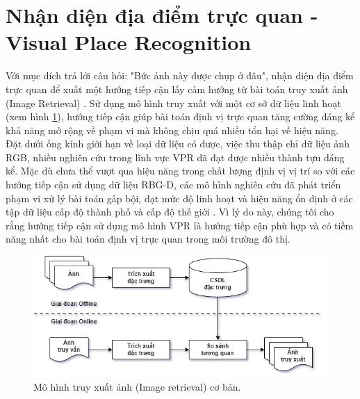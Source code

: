 \section{Nhận diện địa điểm trực quan - Visual Place Recognition}

Với mục đích trả lới câu hỏi: "Bức ảnh này được chụp ở đâu", nhận diện địa điểm trực quan để xuất một hướng tiếp cận lấy cảm hướng từ bài toán truy xuất ảnh (Image Retrieval) \cite{2022arXiv220105816X}. Sử dụng mô hình truy xuất với một cơ sở dữ liệu linh hoạt (xem hình \ref{fig:ir}), hướng tiếp cận giúp bài toán định vị trực quan tăng cường đáng kể khả năng mở rộng về phạm vi mà không chịu quá nhiều tổn hại về hiệu năng. Đặt dưới ống kính giới hạn về loại dữ liệu có được, việc thu thập chỉ dữ liệu ảnh RGB, nhiều nghiên cứu trong lĩnh vực VPR đã đạt được nhiều thành tựu đáng kể. Mặc dù chưa thể vượt qua hiệu năng trong chất lượng định vị vị trí so với các hướng tiếp cận sử dụng dữ liệu RBG-D, các mô hình nghiên cứu đã phát triển phạm vi xử lý bài toán gấp bội, đạt mức độ linh hoạt và hiệu năng ổn định ở các tập dữ liệu cấp độ thành phố \cite{alibey2023mixvpr} và cấp độ thế giới \cite{keetha2023anyloc}. Vì lý do này, chúng tôi cho rằng hướng tiếp cận sử dụng mô hình VPR là hướng tiếp cận phù hợp và có tiềm năng nhất cho bài toán định vị trực quan trong môi trường đô thị.

\begin{figure}[H]
    \centering
    \includegraphics[width=\textwidth]{pics/Chapter2/IR.drawio.png}
    \caption[Mô hình truy xuất ảnh cơ bản]{Mô hình truy xuất ảnh (Image retrieval) cơ bản.}
    \label{fig:ir}
\end{figure}


